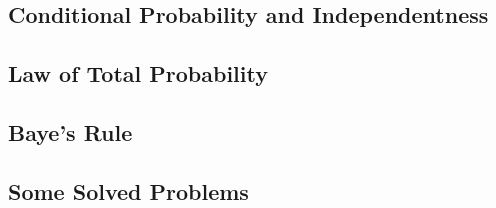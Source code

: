 \subsection{Conditional Probability and Independentness}


\subsection{Law of Total Probability}


\subsection{Baye's Rule}


\subsection{Some Solved Problems}



